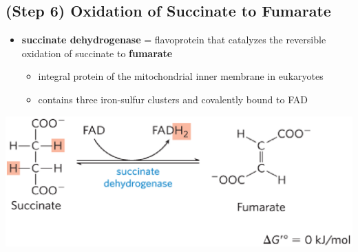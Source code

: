 \documentclass[10pt]{article}
\begin{document}
\subsection*{(Step 6) Oxidation of Succinate to Fumarate}
\begin{itemize}
	\item \textbf{succinate dehydrogenase} = flavoprotein that catalyzes the reversible oxidation of succinate to \textbf{fumarate}
	\begin{itemize}
        \item integral protein of the mitochondrial inner membrane in eukaryotes
        \item contains three iron-sulfur clusters and covalently bound to FAD
    \end{itemize}
\end{itemize}
\begin{center} 
	\includegraphics*[width=\textwidth]{L4_14.png} 
\end{center}
\end{document}
